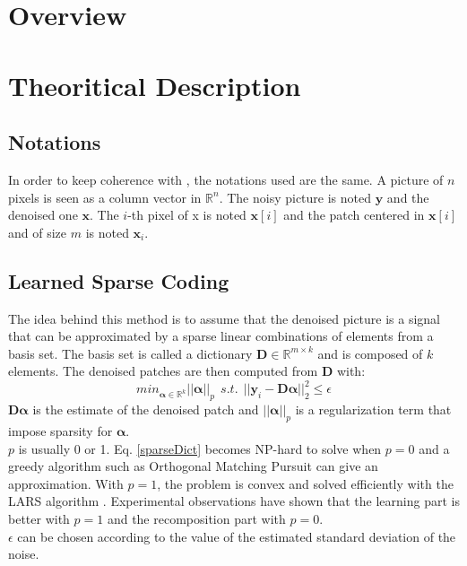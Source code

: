 \documentclass{ipol}
\newcommand{\psize}{m}
\newcommand{\dsize}{k}
\newcommand{\dict}{\textbf{D}}
\newcommand{\code}{\bm{\alpha}}
\newcommand{\pnorm}{p}
\newcommand{\denoi}{\textbf{x}}
\newcommand{\noi}{\textbf{y}}
\newcommand{\RR}{\mathbb{R}}
\newcommand{\Rn}{\mathbb{R}^n}
\begin{document}
\begin{abstract}

\end{abstract} 

\section{Overview}


\section{Theoritical Description}

\subsection{ Notations}

In order to keep coherence with \cite{LSSC}, the notations used are the same.
A picture of $n$ pixels is seen as a column vector in $\Rn$. The noisy picture is noted $\noi$ and the denoised one $\denoi$. The $i$-th pixel of x is noted $\denoi[i]$ and the patch centered in $\denoi[i]$ and of size $\psize$ is noted $\denoi_i$.

\subsection{ Learned Sparse Coding}

The idea behind this method is to assume that the denoised picture is a signal that can be approximated by a sparse linear combinations of elements from a basis set. The basis set is called a dictionary $\dict \in \RR^{\psize \times \dsize}$ and is composed of $\dsize$ elements. The denoised patches are then computed from $\dict$ with:\\
\begin{equation}
	min_{\code\in \RR^\dsize} ||\code||_\pnorm \ \ s.t. \ \ ||\noi_i  - \dict \code||^2_2 \leqslant \epsilon
	\label{sparseDict}
\end{equation}
$\dict \code$ is the estimate of the denoised patch and $||\code||_\pnorm $ is a regularization term that impose sparsity for $\code$.\\ 
$\pnorm$ is usually 0 or 1. Eq. \ref{sparseDict} becomes NP-hard to solve when $\pnorm=0$ and a greedy algorithm such as Orthogonal Matching Pursuit \cite{OMP} can give an approximation. With $\pnorm=1$, the problem is convex and solved efficiently with the LARS algorithm \cite{LARS}. Experimental observations \cite{l0l1} have shown that the learning part is better with $\pnorm=1$ and the recomposition part with $\pnorm=0$.\\
 $\epsilon$ can be chosen according to the value of the estimated standard deviation of the noise.
\end{document}
